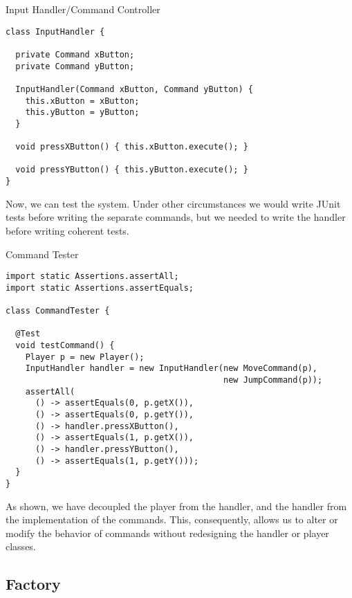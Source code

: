 \begin{cl}{Input Handler/Command Controller}
\begin{lstlisting}[language=MyJava]
class InputHandler {

  private Command xButton;
  private Command yButton;

  InputHandler(Command xButton, Command yButton) {
    this.xButton = xButton;
    this.yButton = yButton;
  }

  void pressXButton() { this.xButton.execute(); }

  void pressYButton() { this.yButton.execute(); }
}
\end{lstlisting}
\end{cl}

Now, we can test the system. Under other circumstances we would write JUnit tests before writing the separate commands, but we needed to write the handler before writing coherent tests. 

\begin{cl}{Command Tester}
\begin{lstlisting}[language=MyJava]
import static Assertions.assertAll;
import static Assertions.assertEquals;

class CommandTester {

  @Test
  void testCommand() {
    Player p = new Player();
    InputHandler handler = new InputHandler(new MoveCommand(p), 
                                            new JumpCommand(p));
    assertAll(
      () -> assertEquals(0, p.getX()),
      () -> assertEquals(0, p.getY()),
      () -> handler.pressXButton(),
      () -> assertEquals(1, p.getX()),
      () -> handler.pressYButton(),
      () -> assertEquals(1, p.getY()));
  }
}
\end{lstlisting}
\end{cl}

As shown, we have decoupled the player from the handler, and the handler from the implementation of the commands. This, consequently, allows us to alter or modify the behavior of commands without redesigning the handler or player classes.

\subsection{Factory}



